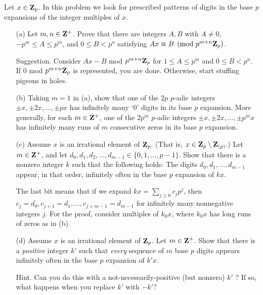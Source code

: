 \begin{challenge} Let $x \in \mathbf{Z}_p$. In this problem we look for prescribed patterns of digits in the base $p$ expansions of the integer multiples of $x$.
\begin{enumerate}
\vspace{-0.12in}
\item[(a)] Let $m, n \in \mathbf{Z}^{+}$. Prove that there are integers $A, B$ with $A\ne 0$, $-p^m \le A  \le p^m$, and $0 \le B < p^n$ satisfying $A x\equiv B\pmod{p^{m+n}\mathbf{Z}_p}$.

{\scriptsize Suggestion. Consider $Ax-B$ mod $p^{m+n}\mathbf{Z}_p$ for $1\le A \le p^m$ and $0 \le B < p^n$. If $0$ mod $p^{m+n}\mathbf{Z}_p$ is represented, you are done. Otherwise, start stuffing pigeons in holes.}

\item[(b)] Taking $m=1$ in (a), show that one of the $2p$ $p$-adic integers $\pm x, \pm 2x, \dots, \pm px$ has infinitely many `$0$' digits in its base $p$ expansion. More generally, for each $m \in \mathbf{Z}^{+}$, one of the $2p^m$ $p$-adic integers $\pm x, \pm 2x, \dots, \pm p^{m} x$ has infinitely many runs of $m$ consecutive zeros in its base $p$ expansion.

\item[(c)] Assume $x$ is an irrational element of $\mathbf{Z}_p$. (That is, $x \in \mathbf{Z}_p \setminus \mathbf{Z}_{(p)}$.) Let $m \in \mathbf{Z}^{+}$, and let $d_0, d_1, d_2, \dots, d_{m-1} \in \{0,1,\dots,p-1\}$. Show that there is a nonzero integer $k$
such that the following holds: The digits $d_0, d_1, \dots, d_{m-1}$ appear, in that order, infinitely often in the base $p$ expansion of $kx$.

{\scriptsize The last bit means that if we expand $kx = \sum_{j\ge 0} c_j p^j$, then $c_j = d_0, c_{j+1} = d_1, \dots, c_{j+m-1} = d_{m-1}$ for infinitely many nonnegative integers $j$. For the proof, consider multiples of $k_0 x$, where $k_0 x$ has long runs of zeros as in (b).} 

\item[(d)] Assume $x$ is an irrational element of $\mathbf{Z}_p$. Let $m \in \mathbf{Z}^{+}$. Show that there is a \emph{positive} integer $k'$
such that \emph{every} sequence of $m$ base $p$ digits appears infinitely often in the base $p$ expansion of $k' x$.


{\scriptsize Hint. Can you do this with a not-necessarily-positive (but nonzero) $k'$%
? If so, what happens when you replace $k'$ with $-k'$? }
\end{enumerate} 

\end{challenge}

